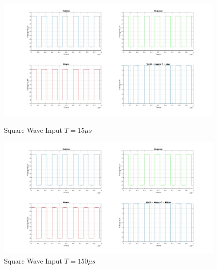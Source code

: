 \documentclass[11pt,a4paper]{article}
\begin{document}
\begin{figure}[h]
	\vspace{-5mm}
	\centering
	\includegraphics[width=\textwidth]{Ex1_Figs/squ15.jpg}
	\vspace{-6mm}
	\caption{Square Wave Input $T = 15 \mu s$}
	\label{fig:RL9}
	\includegraphics[width=\textwidth]{Ex1_Figs/squ150.jpg}
	\vspace{-3mm}
	\caption{Square Wave Input $T = 150 \mu s$}
	\label{fig:RL10}
\end{figure}

\pagebreak
\end{document}
